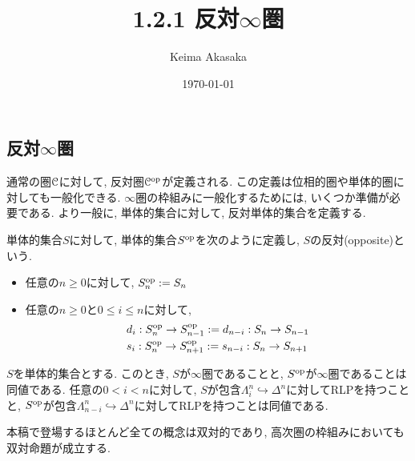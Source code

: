 \documentclass[uplatex, a4paper, 14Q, dvipdfmx]{jsreport}
\title{1.2.1 反対\texorpdfstring{$\infty$}{infty}圏}
\author{Keima Akasaka}
\date{\today}
\begin{document}

\setcounter{chapter}{1}
\setcounter{section}{2} 
\setcounter{subsection}{0}   
\setcounter{subsubsection}{1}

\subsection{反対\texorpdfstring{$\infty$}{infty}圏}

通常の圏$\mathcal{C}$に対して, 反対圏$\mathcal{C}^{\mathrm{op}}$が定義される. 
この定義は位相的圏や単体的圏に対しても一般化できる. 
$\infty$圏の枠組みに一般化するためには, いくつか準備が必要である. 
より一般に, 単体的集合に対して, 反対単体的集合を定義する. 

単体的集合$S$に対して, 単体的集合$S^{\mathrm{op}}$を次のように定義し, $S$の反対(opposite)という. 
\begin{itemize}
  \item 任意の$n \geq 0$に対して, $S^{\mathrm{op}}_n := S_n$
  \item 任意の$n \geq 0$と$0 \leq i \leq n$に対して, 
  \begin{align*}
    & d_i : S^{\mathrm{op}}_n \to S^{\mathrm{op}}_{n-1} := d_{n-i} : S_n \to S_{n-1} \\
    & s_i : S^{\mathrm{op}}_n \to S^{\mathrm{op}}_{n+1} := s_{n-i} : S_n \to S_{n+1}
  \end{align*}
\end{itemize}

$S$を単体的集合とする. 
このとき, $S$が$\infty$圏であることと, $S^{\mathrm{op}}$が$\infty$圏であることは同値である. 
任意の$0<i<n$に対して, $S$が包含$\Lambda^n_i \hookrightarrow \Delta^n$に対してRLPを持つことと, $S^{\mathrm{op}}$が包含$\Lambda^n_{n-i} \hookrightarrow \Delta^n$に対してRLPを持つことは同値である. 

本稿で登場するほとんど全ての概念は双対的であり, 高次圏の枠組みにおいても双対命題が成立する. 
\end{document}
